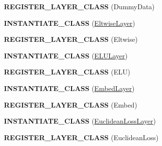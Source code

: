 \begin{DoxyCompactItemize}
\item 
{\bfseries R\+E\+G\+I\+S\+T\+E\+R\+\_\+\+L\+A\+Y\+E\+R\+\_\+\+C\+L\+A\+SS} (Dummy\+Data)\hypertarget{namespacecaffe_a513e7ea04b118df0c23b2e4a295f009d}{}\label{namespacecaffe_a513e7ea04b118df0c23b2e4a295f009d}

\item 
{\bfseries I\+N\+S\+T\+A\+N\+T\+I\+A\+T\+E\+\_\+\+C\+L\+A\+SS} (\hyperlink{classcaffe_1_1EltwiseLayer}{Eltwise\+Layer})\hypertarget{namespacecaffe_a12e39f1c3c66d20c87e732a85a1ce9ec}{}\label{namespacecaffe_a12e39f1c3c66d20c87e732a85a1ce9ec}

\item 
{\bfseries R\+E\+G\+I\+S\+T\+E\+R\+\_\+\+L\+A\+Y\+E\+R\+\_\+\+C\+L\+A\+SS} (Eltwise)\hypertarget{namespacecaffe_a7675bc7c3c792f098fd5aef2b0ae0cb9}{}\label{namespacecaffe_a7675bc7c3c792f098fd5aef2b0ae0cb9}

\item 
{\bfseries I\+N\+S\+T\+A\+N\+T\+I\+A\+T\+E\+\_\+\+C\+L\+A\+SS} (\hyperlink{classcaffe_1_1ELULayer}{E\+L\+U\+Layer})\hypertarget{namespacecaffe_a20ea40591642f5fac862c5d9d9bd21c0}{}\label{namespacecaffe_a20ea40591642f5fac862c5d9d9bd21c0}

\item 
{\bfseries R\+E\+G\+I\+S\+T\+E\+R\+\_\+\+L\+A\+Y\+E\+R\+\_\+\+C\+L\+A\+SS} (E\+LU)\hypertarget{namespacecaffe_a8b1de9e47ccd65cdf8da88cc9b12d9de}{}\label{namespacecaffe_a8b1de9e47ccd65cdf8da88cc9b12d9de}

\item 
{\bfseries I\+N\+S\+T\+A\+N\+T\+I\+A\+T\+E\+\_\+\+C\+L\+A\+SS} (\hyperlink{classcaffe_1_1EmbedLayer}{Embed\+Layer})\hypertarget{namespacecaffe_a134db7f2d2ee76300729a74925fa20cb}{}\label{namespacecaffe_a134db7f2d2ee76300729a74925fa20cb}

\item 
{\bfseries R\+E\+G\+I\+S\+T\+E\+R\+\_\+\+L\+A\+Y\+E\+R\+\_\+\+C\+L\+A\+SS} (Embed)\hypertarget{namespacecaffe_a8e4cb8c13df5e1fff14800717da6f05e}{}\label{namespacecaffe_a8e4cb8c13df5e1fff14800717da6f05e}

\item 
{\bfseries I\+N\+S\+T\+A\+N\+T\+I\+A\+T\+E\+\_\+\+C\+L\+A\+SS} (\hyperlink{classcaffe_1_1EuclideanLossLayer}{Euclidean\+Loss\+Layer})\hypertarget{namespacecaffe_a3486a0b745654ba8a682ff8642fd9b9c}{}\label{namespacecaffe_a3486a0b745654ba8a682ff8642fd9b9c}

\item 
{\bfseries R\+E\+G\+I\+S\+T\+E\+R\+\_\+\+L\+A\+Y\+E\+R\+\_\+\+C\+L\+A\+SS} (Euclidean\+Loss)\hypertarget{namespacecaffe_a36bc5f1ca7b9a883b435101ae8bf3a9b}{}\label{namespacecaffe_a36bc5f1ca7b9a883b435101ae8bf3a9b}


\end{DoxyCompactItemize}
